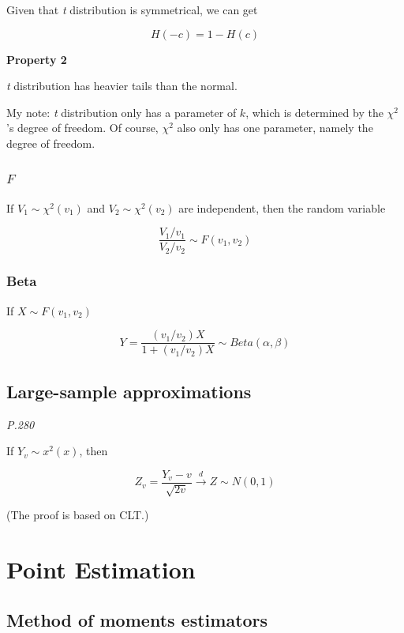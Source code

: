 \documentclass[
]{book}
\begin{document}
Given that \emph{t} distribution is symmetrical, we can get

\[H(-c)=1-H(c)\]

\textbf{Property 2}

\emph{t} distribution has heavier tails than the normal.

My note: \emph{t} distribution only has a parameter of \(k\), which is determined by the \(\chi^2\)'s degree of freedom. Of course, \(\chi^2\) also only has one parameter, namely the degree of freedom.

\hypertarget{f}{%
\subsubsection{\texorpdfstring{\(F\)}{F}}\label{f}}

If \(V_1 \sim \chi^2(v_1)\) and \(V_2 \sim \chi^2(v_2)\) are independent, then the random variable

\[\frac{V_1/v_1}{V_2/v_2}\sim F(v_1,v_2)\]

\hypertarget{beta}{%
\subsubsection{Beta}\label{beta}}

If \(X \sim F(v_1, v_2)\)

\[Y=\frac{(v_1/v_2)X}{1+(v_1/v_2)X} \sim Beta(\alpha, \beta)\]

\hypertarget{large-sample-approximations}{%
\subsection{Large-sample approximations}\label{large-sample-approximations}}

\emph{P.280}

If \(Y_v \sim x^2(x)\), then

\[Z_v =\frac{Y_v-v}{\sqrt{2v}} \xrightarrow{d} Z \sim N(0,1)\]

(The proof is based on CLT.)

\hypertarget{point-estimation}{%
\section{Point Estimation}\label{point-estimation}}

\hypertarget{method-of-moments-estimators}{%
\subsection{Method of moments estimators}\label{method-of-moments-estimators}}
\end{document}
